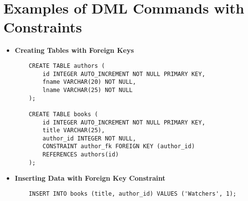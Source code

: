 \documentclass{article}
\begin{document}
\section{Examples of DML Commands with Constraints}
\begin{itemize}
    \item \textbf{Creating Tables with Foreign Keys}
    \begin{verbatim}
    CREATE TABLE authors (
        id INTEGER AUTO_INCREMENT NOT NULL PRIMARY KEY,
        fname VARCHAR(20) NOT NULL,
        lname VARCHAR(25) NOT NULL
    );
    
    CREATE TABLE books (
        id INTEGER AUTO_INCREMENT NOT NULL PRIMARY KEY,
        title VARCHAR(25),
        author_id INTEGER NOT NULL,
        CONSTRAINT author_fk FOREIGN KEY (author_id)
        REFERENCES authors(id)
    );
    \end{verbatim}

    \item \textbf{Inserting Data with Foreign Key Constraint}
    \begin{verbatim}
    INSERT INTO books (title, author_id) VALUES ('Watchers', 1);
    \end{verbatim}
\end{itemize}
\end{document}
